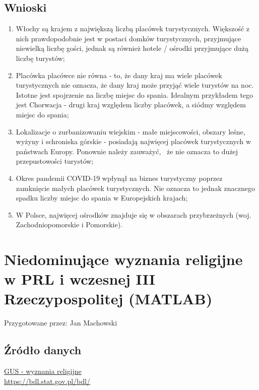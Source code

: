 \documentclass[12pt]{article}
\begin{document}
\subsection{Wnioski}
\begin{enumerate}
    \item Włochy są krajem z największą liczbą placówek turystycznych. Większość z nich prawdopodobnie jest w postaci domków turystycznych,
     przyjmujące niewielką liczbę gości, jednak są również hotele / ośrodki przyjmujące dużą liczbę turystów;
    \item Placówka placówce nie równa - to, że dany kraj ma wiele placówek turystycznych nie oznacza, że dany kraj może przyjąć wiele turystów na noc. 
    Istotne jest spojrzenie na liczbę miejsc do spania. Idealnym przykładem tego jest Chorwacja - drugi kraj względem liczby placówek, a siódmy względem miejsc do spania;
    \item Lokalizacje o zurbanizowaniu wiejskim - małe miejscowości, obszary leśne, wyżyny i schroniska górskie - posiadają najwięcej placówek turystycznych w państwach Europy. Ponownie należy zauważyć, \
    że nie oznacza to dużej przepustowości turystów;
    \item Okres pandemii COVID-19 wpłynął na biznes turystyczny poprzez zamknięcie małych placówek turystycznych. Nie oznacza to jednak znacznego spadku liczby miejsc do spania w Europejskich krajach;
    \item W Polsce, najwięcej ośrodków znajduje się w obszarach przybrzeżnych (woj. Zachodniopomorskie i Pomorskie). 
\end{enumerate}

\newpage
\section{Niedominujące wyznania religijne w PRL i wczesnej III Rzeczypospolitej (MATLAB)}

Przygotowane przez: Jan Machowski

\subsection{Źródło danych}
\href{https://bdl.stat.gov.pl/bdl/}{GUS - wyznania religijne}\\
\url{https://bdl.stat.gov.pl/bdl/}
\end{document}
